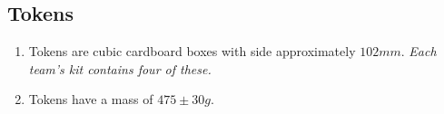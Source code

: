 \subsection{Tokens}
\label{sub:Tokens}
\begin {enumerate}
\item Tokens are cubic cardboard boxes with side approximately $102mm$.
\emph{Each team's kit contains four of these.}
\item Tokens have a mass of $475\pm30g$.
\end {enumerate}



\clearpage
